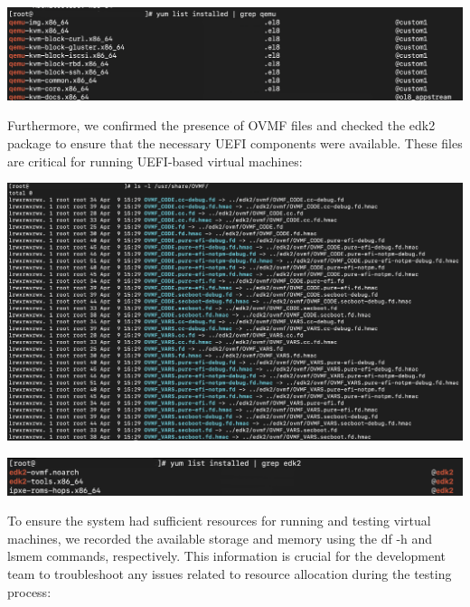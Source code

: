 \begin{center}
    \centering
    \includegraphics[width=\textwidth]{Images/QEMU Version_ 7.2.0-14 oci.png}
    \label{fig:casa}
\end{center}

Furthermore, we confirmed the presence of OVMF files and checked the edk2 package to ensure that the necessary UEFI components were available. These files are critical for running UEFI-based virtual machines:

\begin{center}
    \centering
    \includegraphics[width=\textwidth]{Images/OVMF Folder.png}
    \label{fig:casa}
\end{center}

\begin{center}
    \centering
    \includegraphics[width=\textwidth]{Images/edk2 Version.png}
    \label{fig:casa}
\end{center}

To ensure the system had sufficient resources for running and testing virtual machines, we recorded the available storage and memory using the df -h and lsmem commands, respectively. This information is crucial for the development team to troubleshoot any issues related to resource allocation during the testing process:

